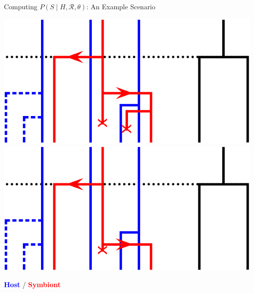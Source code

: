 \documentclass{beamer}
\newcommand{\R}{\ensuremath{\mathcal{R}}}
\begin{document}
\begin{frame}{Computing $P\left(S\mid H,\R,\theta\right)$: An Example Scenario}
\begin{overprint}
\centering\includegraphics{figures/example_case/5.pdf}
\centering\includegraphics{figures/example_case/6.pdf}
\end{overprint}

\vspace{0.25in}\textcolor{blue}{\textbf{Host}} / \textcolor{red}{\textbf{Symbiont}}

\end{frame}
\end{document}
